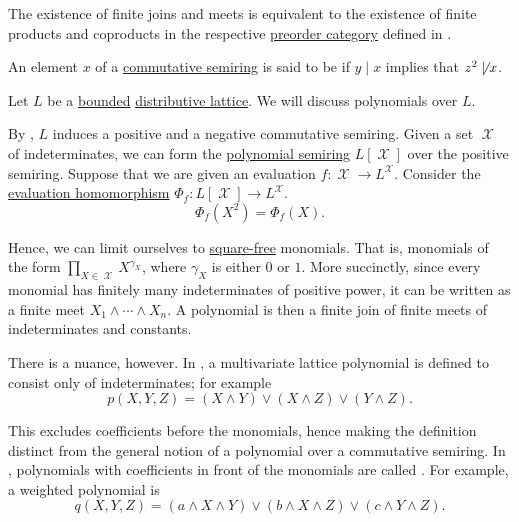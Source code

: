 \begin{remark}\label{rem:lattice_categorical_product}
  The existence of finite joins and meets is equivalent to the existence of finite products and coproducts in the respective \hyperref[def:preorder_category]{preorder category} defined in .
\end{remark}

\begin{definition}\label{def:square_free}
  An element \( x \) of a \hyperref[def:semiring/commutative]{commutative semiring} is said to be  if \( y \mid x \) implies that \( z^2 \not\mid x \).
\end{definition}

\begin{remark}\label{rem:lattice_polynomials}
  Let \( L \) be a \hyperref[def:semilattice/bounded]{bounded} \hyperref[def:semilattice/distributive_lattice]{distributive lattice}. We will discuss polynomials over \( L \).

  By , \( L \) induces a positive and a negative commutative semiring. Given a set \( \mscrX \) of indeterminates, we can form the \hyperref[def:polynomial_algebra]{polynomial semiring} \( L[\mscrX] \) over the positive semiring. Suppose that we are given an evaluation \( f: \mscrX \to L^\mscrX \). Consider the \hyperref[thm:polynomial_algebra_universal_property]{evaluation homomorphism} \( \Phi_f: L[\mscrX] \to L^\mscrX \).
  \begin{equation*}
    \Phi_f(X^2) = \Phi_f(X).
  \end{equation*}

  Hence, we can limit ourselves to \hyperref[def:square_free]{square-free} monomials. That is, monomials of the form \( \prod_{X \in \mscrX} X^{\gamma_X} \), where \( \gamma_X \) is either \( 0 \) or \( 1 \). More succinctly, since every monomial has finitely many indeterminates of positive power, it can be written as a finite meet \( X_1 \wedge \cdots \wedge X_n \). A polynomial is then a finite join of finite meets of indeterminates and constants.

  There is a nuance, however. In \cite[def. I.4.2]{Gratzer1978}, a multivariate lattice polynomial is defined to consist only of indeterminates; for example
  \begin{equation*}
    p(X, Y, Z) = (X \wedge Y) \vee (X \wedge Z) \vee (Y \wedge Z).
  \end{equation*}

  This excludes coefficients before the monomials, hence making the definition distinct from the general notion of a polynomial over a commutative semiring. In \cite{Marichal2007}, polynomials with coefficients in front of the monomials are called . For example, a weighted polynomial is
  \begin{equation*}
    q(X, Y, Z) = (a \wedge X \wedge Y) \vee (b \wedge X \wedge Z) \vee (c \wedge Y \wedge Z).
  \end{equation*}


\end{remark}

